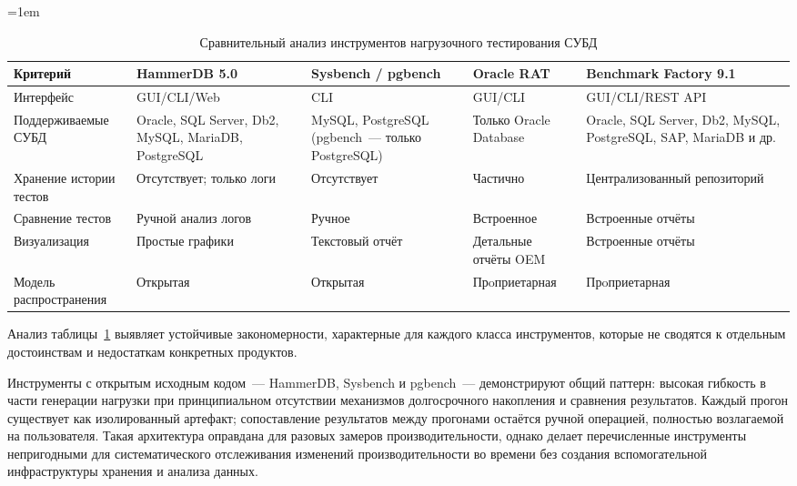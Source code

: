 {
\renewcommand{\arraystretch}{0.9}
\setlength{\tabcolsep}{3pt}
\sloppy
{}
\emergencystretch=1em

\begin{table}[H]
    \centering
    \caption{Сравнительный анализ инструментов нагрузочного тестирования СУБД}
    \label{tab:comparison}
    \begin{tabularx}{\textwidth}{|>{\RaggedRight}p{}|>{\RaggedRight}X|>{\RaggedRight}X|>{\RaggedRight}X|>{\RaggedRight}X|}
        \hline
        Критерий & HammerDB 5.0 & Sysbench / pgbench & Oracle RAT & Benchmark Factory 9.1 \\
        \hline
        Интер\-фейс & GUI\slash CLI\slash Web & CLI & GUI\slash CLI & GUI\slash CLI\slash REST API \\
        \hline
        Под\-дер\-жи\-ва\-емые СУБД & Oracle, SQL Server, Db2, MySQL, MariaDB, PostgreSQL & MySQL, PostgreSQL (pgbench~--- только PostgreSQL) & Только Oracle Database & Oracle, SQL Server, Db2, MySQL, PostgreSQL, SAP, MariaDB и др. \\
        \hline
        Хранение истории тестов & Отсутствует; только логи & Отсутствует & Частично & Цент\-ра\-ли\-зо\-ван\-ный репо\-зи\-то\-рий \\
        \hline
        Сравнение тестов & Ручной анализ логов & Ручное & Встроенное & Встроенные отчёты \\
        \hline
        Ви\-зу\-а\-ли\-за\-ция & Простые графики & Текстовый отчёт & Детальные отчёты OEM & Встроенные отчёты \\
        \hline
        Модель рас\-про\-стра\-не\-ния & Открытая & Открытая & Прo\-прие\-тар\-ная & Прo\-прие\-тар\-ная \\
        \hline
    \end{tabularx}
\end{table}
}

Анализ таблицы~\ref{tab:comparison} выявляет устойчивые закономерности, характерные для каждого класса инструментов, которые не сводятся к отдельным достоинствам и недостаткам конкретных продуктов.

Инструменты с открытым исходным кодом~--- HammerDB, Sysbench и pgbench~--- демонстрируют общий паттерн: высокая гибкость в части генерации нагрузки при принципиальном отсутствии механизмов долгосрочного накопления и сравнения результатов. Каждый прогон существует как изолированный артефакт; сопоставление результатов между прогонами остаётся ручной операцией, полностью возлагаемой на пользователя. Такая архитектура оправдана для разовых замеров производительности, однако делает перечисленные инструменты непригодными для систематического отслеживания изменений производительности во времени без создания вспомогательной инфраструктуры хранения и анализа данных.

